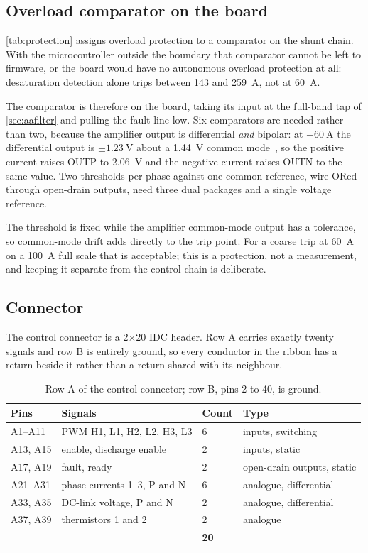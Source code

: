 \subsection{Overload comparator on the board}

\cref{tab:protection} assigns overload protection to a comparator on the
shunt chain. With the microcontroller outside the boundary that comparator
cannot be left to firmware, or the board would have no autonomous overload
protection at all: desaturation detection alone trips between
\SI{143}{} and \SI{259}{\ampere}, not at \SI{60}{\ampere}.

The comparator is therefore on the board, taking its input at the full-band
tap of \cref{sec:aafilter} and pulling the fault line low. Six comparators
are needed rather than two, because the amplifier output is differential
\emph{and} bipolar: at $\pm\SI{60}{\ampere}$ the differential output is
$\pm\SI{1.23}{\volt}$ about a \SI{1.44}{\volt} common
mode~\cite{ti_amc1302}, so the positive current raises OUTP to
\SI{2.06}{\volt} and the negative current raises OUTN to the same value.
Two thresholds per phase against one common reference, wire-ORed through
open-drain outputs, need three dual packages and a single voltage
reference.

The threshold is fixed while the amplifier common-mode output has a
tolerance, so common-mode drift adds directly to the trip point. For a
coarse trip at \SI{60}{\ampere} on a \SI{100}{\ampere} full scale that is
acceptable; this is a protection, not a measurement, and keeping it
separate from the control chain is deliberate.

\subsection{Connector}

The control connector is a \num{2}$\times$\num{20} IDC header. Row A carries
exactly twenty signals and row B is entirely ground, so every conductor in
the ribbon has a return beside it rather than a return shared with its
neighbour.

\begin{table}[htbp]
\centering
\caption{Row A of the control connector; row B, pins 2 to 40, is ground.}
\label{tab:connector}
\small
\begin{tabular}{llll}
\toprule
Pins & Signals & Count & Type \\
\midrule
A1--A11 & PWM H1, L1, H2, L2, H3, L3 & 6 & inputs, switching \\
A13, A15 & enable, discharge enable & 2 & inputs, static \\
A17, A19 & fault, ready & 2 & open-drain outputs, static \\
A21--A31 & phase currents 1--3, P and N & 6 & analogue, differential \\
A33, A35 & DC-link voltage, P and N & 2 & analogue, differential \\
A37, A39 & thermistors 1 and 2 & 2 & analogue \\
\midrule
 & & \textbf{20} & \\
\bottomrule
\end{tabular}
\end{table}

